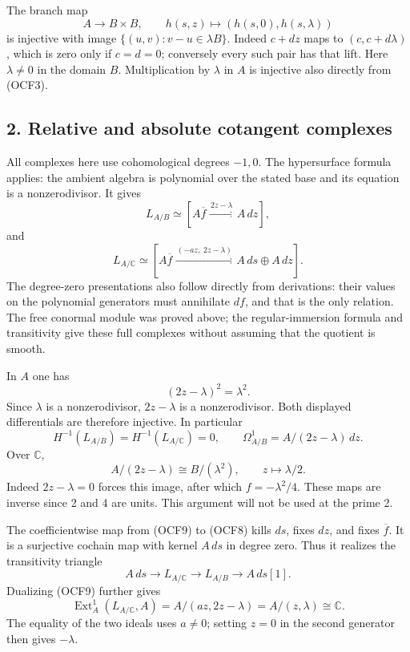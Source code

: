 \documentclass[
]{article}
\begin{document}
The branch map \[
A\longrightarrow B\times B,\qquad
h(s,z)\longmapsto(h(s,0),h(s,\lambda))
\tag{OCF7}
\] is injective with image \(\{(u,v):v-u\in\lambda B\}\). Indeed
\(c+dz\) maps to \((c,c+d\lambda)\), which is zero only if \(c=d=0\);
conversely every such pair has that lift. Here \(\lambda\ne0\) in the
domain \(B\). Multiplication by \(\lambda\) in \(A\) is injective also
directly from (OCF3).

\subsection{2. Relative and absolute cotangent
complexes}\label{relative-and-absolute-cotangent-complexes}

All complexes here use cohomological degrees \(-1,0\). The hypersurface
formula applies: the ambient algebra is polynomial over the stated base
and its equation is a nonzerodivisor. It gives \[
L_{A/B}\simeq
[A\overline f\xrightarrow{\,2z-\lambda\,}A\,dz],
\tag{OCF8}
\] and \[
L_{A/\mathbb C}\simeq
[A\overline f\xrightarrow{\,(-az,\;2z-\lambda)\,}
 A\,ds\oplus A\,dz].
\tag{OCF9}
\] The degree-zero presentations also follow directly from derivations:
their values on the polynomial generators must annihilate \(df\), and
that is the only relation. The free conormal module was proved above;
the regular-immersion formula and transitivity give these full complexes
without assuming that the quotient is smooth.

In \(A\) one has \[
(2z-\lambda)^2=\lambda^2.
\tag{OCF10}
\] Since \(\lambda\) is a nonzerodivisor, \(2z-\lambda\) is a
nonzerodivisor. Both displayed differentials are therefore injective. In
particular \[
H^{-1}(L_{A/B})=H^{-1}(L_{A/\mathbb C})=0,
\qquad
\Omega^1_{A/B}=A/(2z-\lambda)\,dz.
\tag{OCF11}
\] Over \(\mathbb C\), \[
A/(2z-\lambda)\cong B/(\lambda^2),\qquad z\mapsto\lambda/2.
\tag{OCF12}
\] Indeed \(2z-\lambda=0\) forces this image, after which
\(f=-\lambda^2/4\). These maps are inverse since 2 and 4 are units. This
argument will not be used at the prime 2.

The coefficientwise map from (OCF9) to (OCF8) kills \(ds\), fixes
\(dz\), and fixes \(\overline f\). It is a surjective cochain map with
kernel \(A\,ds\) in degree zero. Thus it realizes the transitivity
triangle \[
A\,ds\longrightarrow L_{A/\mathbb C}
\longrightarrow L_{A/B}\longrightarrow A\,ds[1].
\tag{OCF13}
\] Dualizing (OCF9) further gives \[
\operatorname{Ext}^1_A(L_{A/\mathbb C},A)
=A/(az,2z-\lambda)=A/(z,\lambda)\cong\mathbb C.
\tag{OCF14}
\] The equality of the two ideals uses \(a\ne0\); setting \(z=0\) in the
second generator then gives \(-\lambda\).
\end{document}
